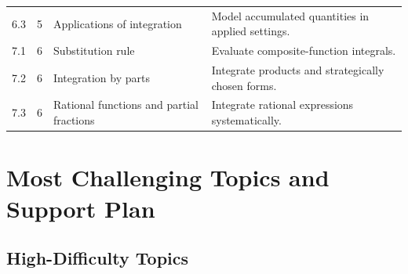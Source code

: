 \documentclass[11pt]{article}
\begin{document}
\begin{longtable}{p{} p{} p{} p{}}
6.3 & 5 & Applications of integration & Model accumulated quantities in applied settings. \\

7.1 & 6 & Substitution rule & Evaluate composite-function integrals. \\

7.2 & 6 & Integration by parts & Integrate products and strategically chosen forms. \\

7.3 & 6 & Rational functions and partial fractions & Integrate rational expressions systematically. \\
\bottomrule
\end{longtable}

\section{Most Challenging Topics and Support Plan}

\subsection{High-Difficulty Topics}
\end{document}
